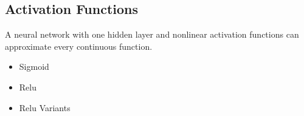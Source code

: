 \subsection{Activation Functions}

A neural network with one hidden layer and nonlinear activation functions can approximate every continuous function.

\begin{itemize}
    \item Sigmoid
    \item Relu
    \item Relu Variants
\end{itemize}